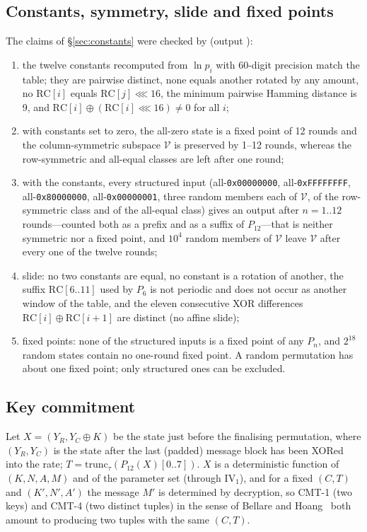 \documentclass{iacrtrans}
\newcommand{\PP}[1]{P_{#1}}
\newcommand{\rotl}{\lll}
\begin{document}
\subsection{Constants, symmetry, slide and fixed points}
\label{sec:constcheck}
The claims of \S\ref{sec:constants} were checked by  (output ):
\begin{enumerate}
\item the twelve constants recomputed from $\ln p_i$ with 60-digit precision match the table; they are pairwise distinct, none equals another rotated by any amount, no $\mathrm{RC}[i]$ equals $\mathrm{RC}[j]\rotl 16$, the minimum pairwise Hamming distance is 9, and $\mathrm{RC}[i]\oplus(\mathrm{RC}[i]\rotl 16) \neq 0$ for all $i$;
\item with constants set to zero, the all-zero state is a fixed point of 12 rounds and the column-symmetric subspace $\mathcal{V}$ is preserved by 1--12 rounds, whereas the row-symmetric and all-equal classes are left after one round;
\item with the constants, every structured input (all-\texttt{0x00000000}, all-\texttt{0xFFFFFFFF}, all-\texttt{0x80000000}, all-\texttt{0x00000001}, three random members each of $\mathcal{V}$, of the row-symmetric class and of the all-equal class) gives an output after $n = 1..12$ rounds---counted both as a prefix and as a suffix of $\PP{12}$---that is neither symmetric nor a fixed point, and $10^4$ random members of $\mathcal{V}$ leave $\mathcal{V}$ after every one of the twelve rounds;
\item slide: no two constants are equal, no constant is a rotation of another, the suffix $\mathrm{RC}[6..11]$ used by $\PP{6}$ is not periodic and does not occur as another window of the table, and the eleven consecutive XOR differences $\mathrm{RC}[i]\oplus\mathrm{RC}[i+1]$ are distinct (no affine slide);
\item fixed points: none of the structured inputs is a fixed point of any $\PP{n}$, and $2^{18}$ random states contain no one-round fixed point. A random permutation has about one fixed point; only structured ones can be excluded.
\end{enumerate}

\subsection{Key commitment}
\label{sec:commitment}
Let $X = (Y_R, Y_C \oplus K)$ be the state just before the finalising permutation, where $(Y_R, Y_C)$ is the state after the last (padded) message block has been XORed into the rate; $T = \mathrm{trunc}_\tau(\PP{12}(X)[0..7])$. $X$ is a deterministic function of $(K, N, A, M)$ and of the parameter set (through $\mathrm{IV}_1$), and for a fixed $(C, T)$ and $(K', N', A')$ the message $M'$ is determined by decryption, so CMT-1 (two keys) and CMT-4 (two distinct tuples) in the sense of Bellare and Hoang~\cite{BH22} both amount to producing two tuples with the same $(C,T)$.
\end{document}
